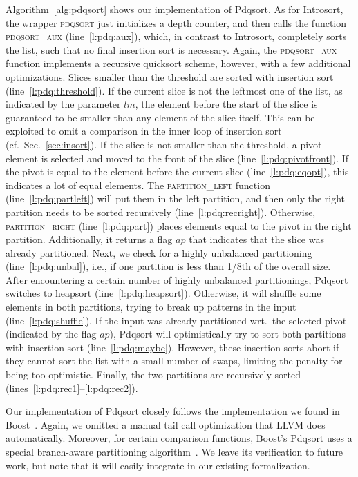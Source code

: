 \documentclass[runningheads]{llncs}
\begin{document}
  Algorithm~\ref{alg:pdqsort} shows our implementation of Pdqsort.
  As for Introsort, the wrapper \textsc{pdqsort} just initializes a depth counter, and then calls the function \textsc{pdqsort\_aux}
  (line~\ref{l:pdq:aux}),
  which, in contrast to Introsort, completely sorts the list, such that no final insertion sort is necessary.
  Again, the \textsc{pdqsort\_aux} function implements a recursive quicksort scheme, however, with a few additional optimizations.
  Slices smaller than the threshold are sorted with insertion sort (line~\ref{l:pdq:threshold}). If the current slice is not the leftmost one
  of the list, as indicated by the parameter $lm$,
  the element before the start of the slice is guaranteed to be smaller than any element of the slice itself. This can be exploited to omit a comparison
  in the inner loop of insertion sort (cf.~Sec.~\ref{sec:insort}).
  If the slice is not smaller than the threshold, a pivot element is selected and moved to the front of the slice (line~\ref{l:pdq:pivotfront}).
  If the pivot is equal to the element before the current slice (line~\ref{l:pdq:eqopt}), this indicates a lot of equal elements.
  The \textsc{partition\_left} function (line~\ref{l:pdq:partleft}) will put them in the left partition, and then only the right partition needs
  to be sorted recursively (line~\ref{l:pdq:recright}).
  Otherwise, \textsc{partition\_right} (line~\ref{l:pdq:part}) places elements equal to the pivot in the right partition.
  Additionally, it returns a flag $ap$ that indicates that the slice was already partitioned.
  Next, we check for a highly unbalanced partitioning (line~\ref{l:pdq:unbal}), i.e., if one partition is less than 1/8th of the overall size.
  After encountering a certain number of highly unbalanced partitionings, Pdqsort switches to heapsort (line~\ref{l:pdq:heapsort}).
  Otherwise, it will shuffle some elements in both partitions, trying to break up patterns in the input (line~\ref{l:pdq:shuffle}).
  If the input was already partitioned wrt.\ the selected pivot (indicated by the flag $ap$),
  Pdqsort will optimistically try to sort both partitions with insertion sort (line~\ref{l:pdq:maybe}).
  However, these insertion sorts abort if they cannot sort the list with a small number of swaps, limiting the penalty for being too optimistic.
  Finally, the two partitions are recursively sorted (lines~\ref{l:pdq:rec1}--\ref{l:pdq:rec2}).

  Our implementation of Pdqsort closely follows the implementation we found in Boost~\cite{boost}.
  Again, we omitted a manual tail call optimization that LLVM does automatically.
  Moreover, for certain comparison functions, Boost's Pdqsort uses a special branch-aware partitioning algorithm~\cite{EdWe16}.
  We leave its verification to future work, but note that it will easily integrate in our existing formalization.
\end{document}
